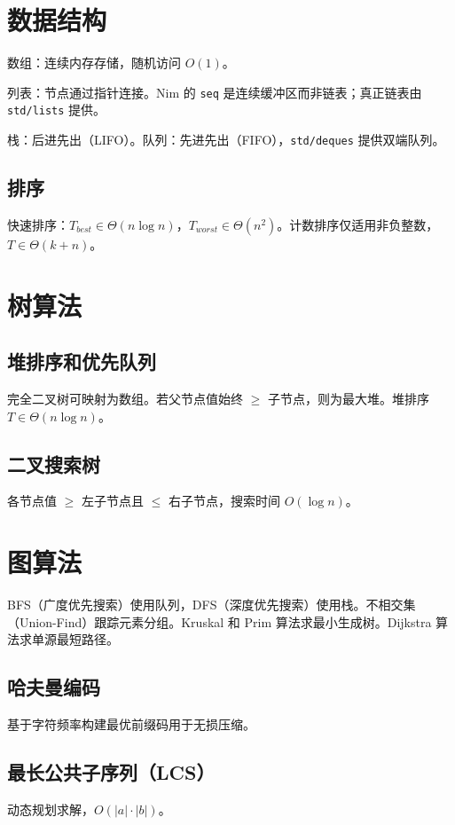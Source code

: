 \documentclass[justified, sixbynine]{tufte-book}
\def\ft{\small\tt}
\theoremstyle{plain}%
\newtheorem * {corollary}{推论}
\theoremstyle{definition}
\theoremstyle{remark}
\newtheorem * {remark}{注记}
\newtheorem * {note}{注释}
\begin{document}
\begin{fullwidth}
\goodbreak\section{数据结构}

数组：连续内存存储，随机访问 $O(1)$。

列表：节点通过指针连接。Nim 的 {\ft seq} 是连续缓冲区而非链表；真正链表由 {\ft std/lists} 提供。

栈：后进先出（LIFO）。队列：先进先出（FIFO），{\ft std/deques} 提供双端队列。

\goodbreak\subsection{排序}

快速排序：$T_{best}\in\Theta(n\log n)$，$T_{worst}\in\Theta(n^2)$。计数排序仅适用非负整数，$T\in\Theta(k+n)$。

\goodbreak\section{树算法}

\subsection{堆排序和优先队列}
完全二叉树可映射为数组。若父节点值始终 $\ge$ 子节点，则为最大堆。堆排序 $T\in\Theta(n\log n)$。

\subsection{二叉搜索树}
各节点值 $\ge$ 左子节点且 $\le$ 右子节点，搜索时间 $O(\log n)$。

\goodbreak\section{图算法}

BFS（广度优先搜索）使用队列，DFS（深度优先搜索）使用栈。不相交集（Union-Find）跟踪元素分组。Kruskal 和 Prim 算法求最小生成树。Dijkstra 算法求单源最短路径。

\subsection{哈夫曼编码}
基于字符频率构建最优前缀码用于无损压缩。

\subsection{最长公共子序列（LCS）}
动态规划求解，$O(|a|\cdot|b|)$。


\end{fullwidth}
\end{document}
